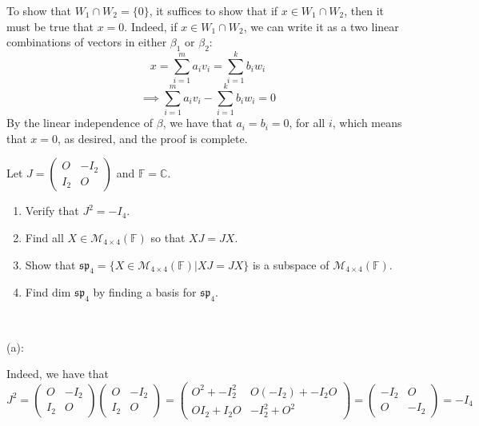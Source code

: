 \documentclass{article}
\theoremstyle{plain} %
\numberwithin{thm}{section} %
\theoremstyle{definition}
\begin{document}
\begin{question}{9}
        To show that \(W_1 \cap W_2 = \{ 0 \}\), it suffices to show that if \(x \in W_1 \cap W_2\), then it must be true that \(x = 0\). Indeed, if \(x \in W_1 \cap W_2\), we can write it as a two linear combinations of vectors in either \(\beta _1\) or \(\beta _2\):
        \[
            x = \sum_{i=1}^{m} a_i v_i = \sum_{i=1}^{k} b_i w_i
        \]
        \[
            \implies \sum_{i=1}^{m} a_i v_i - \sum_{i=1}^{k} b_i w_i = 0
        \]
        By the linear independence of \(\beta\), we have that \(a_i = b_i = 0\), for all \(i\), which means that \(x = 0\), as desired, and the proof is complete.
    \end{question}
    \newpage
    \begin{question}{10}
        Let \( J = \left( \begin{array}{c|c} O & -I_2 \\ \hline I_2 & O \end{array} \right) \) and \( \mathbb{F} = \mathbb{C} \).
        
        \begin{enumerate}[label=(\alph*)]
            \item Verify that \( J^2 = -I_4 \).
            \item Find all \( X \in \mathcal{M}_{4\times 4}(\mathbb{F}) \) so that \( XJ = JX \).
            \item Show that \( \mathfrak{sp}_4 = \{ X \in \mathcal{M}_{4\times 4}(\mathbb{F}) | XJ = JX \} \) is a subspace of \( \mathcal{M}_{4\times 4}(\mathbb{F}) \).
            \item Find dim \( \mathfrak{sp}_4 \) by finding a basis for \( \mathfrak{sp}_4 \).
        \end{enumerate}
        \tcblower
        \ 

        (a):

        Indeed, we have that
        \[
            J^2 = \left( \begin{array}{c|c} O & -I_2 \\ \hline I_2 & O \end{array} \right) \left( \begin{array}{c|c} O & -I_2 \\ \hline I_2 & O \end{array} \right) = \left( \begin{array}{c|c} O^2 + -I_2^2 & O(-I_2) + -I_2 O \\ \hline OI_2 + I_2 O & - I_2^2 + O^2 \end{array} \right) = \left( \begin{array}{c|c} -I_2 & O \\ \hline O & -I_2 \end{array} \right) = -I_4
        \]


\end{question}
\end{document}
